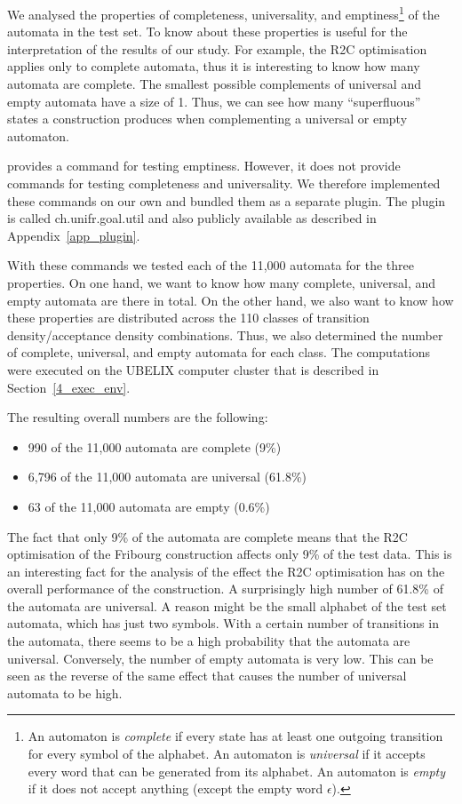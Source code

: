We analysed the properties of completeness, universality, and emptiness\footnote{An automaton is \textit{complete} if every state has at least one outgoing transition for every symbol of the alphabet. An automaton is \textit{universal} if it accepts every word that can be generated from its alphabet. An automaton is \textit{empty} if it does not accept anything (except the empty word $\epsilon$).} of the automata in the \goal{} test set. To know about these properties is useful for the interpretation of the results of our study. For example, the R2C optimisation applies only to complete automata, thus it is interesting to know how many automata are complete. The smallest possible complements of universal and empty automata have a size of 1. Thus, we can see how many ``superfluous'' states a construction produces when complementing a universal or empty automaton.

\goal{} provides a command for testing emptiness. However, it does not provide commands for testing completeness and universality. We therefore implemented these commands on our own and bundled them as a separate \goal{} plugin. The plugin is called \textsf{ch.unifr.goal.util} and also publicly available as described in Appendix~\ref{app_plugin}.

With these \goal{} commands we tested each of the 11,000 automata for the three properties. On one hand, we want to know how many complete, universal, and empty automata are there in total. On the other hand, we also want to know how these properties are distributed across the 110 classes of transition density/acceptance density combinations. Thus, we also determined the number of complete, universal, and empty automata for each class. The computations were executed on the UBELIX computer cluster that is described in Section~\ref{4_exec_env}.

The resulting overall numbers are the following:
\begin{itemize}
\item 990 of the 11,000 automata are complete (9\%)
\item 6,796 of the 11,000 automata are universal (61.8\%)
\item 63 of the 11,000 automata are empty (0.6\%)
\end{itemize}

The fact that only 9\% of the automata are complete means that the R2C optimisation of the Fribourg construction affects only 9\% of the test data. This is an interesting fact for the analysis of the effect the R2C optimisation has on the overall performance of the construction. A surprisingly high number of 61.8\% of the automata are universal. A reason might be the small alphabet of the \goal{} test set automata, which has just two symbols. With a certain number of transitions in the automata, there seems to be a high probability that the automata are universal. Conversely, the number of empty automata is very low. This can be seen as the reverse of the same effect that causes the number of universal automata to be high.

